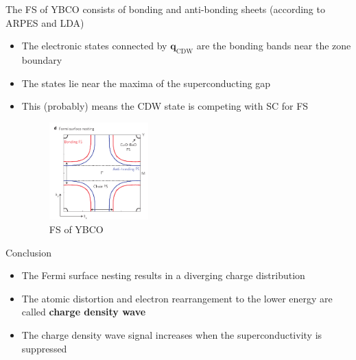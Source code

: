 \documentclass{beamer}
\newcommand*\vf[1]{\mathbf{#1}}
\begin{document}
\begin{frame}{The FS of YBCO consists of bonding and anti-bonding sheets (according to ARPES and LDA)}
\begin{itemize}
\item The electronic states connected by $\vf{q}_{\text{CDW}}$ are the bonding bands near the zone boundary
\item The states lie near the maxima of the superconducting gap
\item This (probably) means the CDW state is competing with SC for FS
\begin{figure}
\includegraphics[width=1.5in]{figs/chang_3.pdf}
\caption{\label{fig:chang_3} FS of YBCO}
\end{figure}
\end{itemize}
\end{frame}

\begin{frame}{Conclusion}
\begin{itemize}
\item The Fermi surface nesting results in a diverging charge distribution
\item The atomic distortion and electron rearrangement to the lower energy are called \textbf{charge density wave}
\item The charge density wave signal increases when the superconductivity is suppressed
\end{itemize}
\end{frame}

\end{document}
